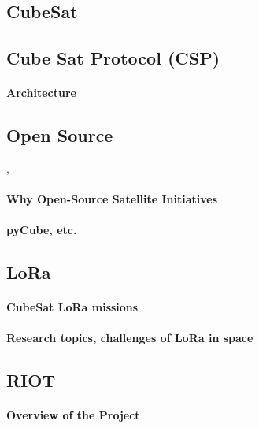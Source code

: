 \documentclass[conference]{IEEEtran}
\begin{document}
\subsection{CubeSat}
\label{sec:cubesat}

\subsection{Cube Sat Protocol (CSP)}
\label{sec:csp}

\paragraph*{Architecture}

\subsection{Open Source}\cite{shalashov2021OpenSourceCubeSatReview}, \cite{Holliday2019PyCubedAO}
\paragraph*{Why Open-Source Satellite Initiatives}
\paragraph*{pyCube, etc.}

\subsection{LoRa} \cite{saeed2020CubeSatReview}
\label{sec:lora-cubesat}
\paragraph*{CubeSat LoRa missions}
\paragraph*{Research topics, challenges of LoRa in space}

\subsection{RIOT} \cite{baccelli2018riot}
\paragraph{Overview of the Project}
\end{document}
